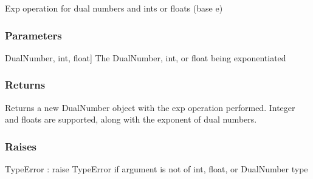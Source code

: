 \documentclass[letterpaper,10pt,english]{sphinxmanual}
\begin{document}

\begin{fulllineitems}
\label{\detokenize{autodiff:autodiff.exp}}
\pysigstartsignatures
{}
\pysigstopsignatures
\sphinxAtStartPar
Exp operation for dual numbers and ints or floats (base e)


\subsubsection{Parameters}
\label{\detokenize{autodiff:id54}}\begin{description}
\sphinxlineitem{x}{[}DualNumber, int, float{]}
\sphinxAtStartPar
The DualNumber, int, or float being exponentiated

\end{description}


\subsubsection{Returns}
\label{\detokenize{autodiff:id55}}\begin{description}
\sphinxAtStartPar
Returns a new DualNumber object with the exp operation performed. Integer and
floats are supported, along with the exponent of dual numbers.

\end{description}


\subsubsection{Raises}
\label{\detokenize{autodiff:id56}}
\sphinxAtStartPar
TypeError : raise TypeError if argument is not of int, float, or DualNumber type

\end{fulllineitems}

\end{document}
